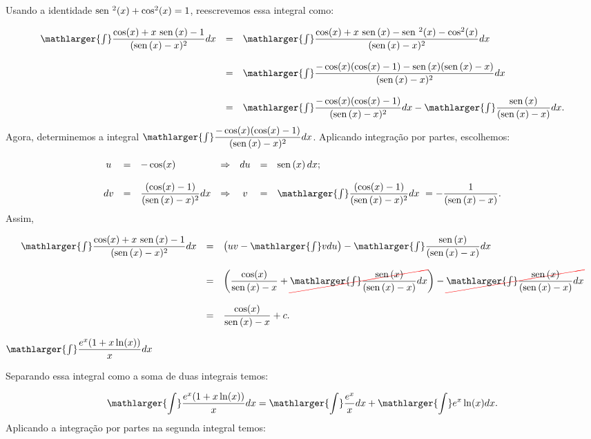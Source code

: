 \cleardoublepage\documentclass[../main.tex]{subfiles}
\begin{document}
\begin{exeresol}
\begin{compactenum}[a)]
 \begin{solution}
 Usando a identidade \( \operatorname{sen}\,^2 (x)+\cos^2 (x)=1\), reescrevemos essa integral como:

\[ \begin{array}{rcl} \mathlarger{\int} \dfrac{\cos (x) + x\,\sen (x) -1}{(\sen (x) -x)^2} dx &=& \mathlarger{\int} \dfrac{\cos (x) + x\,\sen (x) -\sen^2 (x)-\cos^2 (x)}{(\sen (x) -x)^2} dx\\ \\ &=& \mathlarger{\int} \dfrac{-\cos (x)(\cos (x) -1)- \sen (x)(\sen (x)-x)}{(\sen (x) -x)^2} dx\\ \\ &=& \mathlarger{\int} \dfrac{-\cos (x)(\cos (x) -1)}{(\sen (x) -x)^2} dx - \mathlarger{\int} \dfrac{\sen (x)}{(\sen (x) -x)} dx. \end{array} \]
Agora, determinemos a integral \(\mathlarger{\int} \dfrac{-\cos (x)(\cos (x) -1)}{(\sen (x) -x)^2} dx \). Aplicando integração por partes, escolhemos:

\[ \begin{array}{cclcccl} u &=& -\cos (x)&\Rightarrow&du &=& \sen (x)\,dx;\\ \\ dv &=& \dfrac{(\cos (x) -1)}{(\sen (x) -x)^2}dx &\Rightarrow & v &=& \mathlarger{\int} \dfrac{(\cos (x) -1)}{(\sen (x) -x)^2}dx \,\, =-\dfrac{1}{(\sen (x) -x)}. \end{array} \]
Assim,

\[ \begin{array}{rcl} \mathlarger{\int} \dfrac{\cos (x) + x\,\sen (x) -1}{(\sen (x) -x)^2} dx &=& \left( uv-\mathlarger{\int} vdu \right) - \mathlarger{\int} \dfrac{\sen (x)}{(\sen (x) -x)} dx\\ \\ &=&\left( \dfrac{\cos (x) }{\sen (x) -x} + \Ccancel[red]{\mathlarger{\int} \dfrac{\sen (x)}{(\sen (x) -x)} dx} \right) - \Ccancel[red]{\mathlarger{\int} \dfrac{\sen (x)}{(\sen (x) -x)} dx}\\ \\ &=& \dfrac{\cos (x) }{\sen (x) -x} +c. \end{array} \]
 \end{solution}
 \item \(\mathlarger{\int}\dfrac{e^x(1+x\ln (x))}{x} dx\)
 
 \begin{solution}
 Separando essa integral como a soma de duas integrais temos:

\[ \mathlarger{\int}\dfrac{e^x(1+x\ln (x))}{x} dx= \mathlarger{\int}\dfrac{e^x}{x} dx + \mathlarger{\int} e^x \ln (x) dx. \]
Aplicando a integração por partes na segunda integral temos:


\end{solution}
\end{compactenum}
\end{exeresol}
\end{document}
